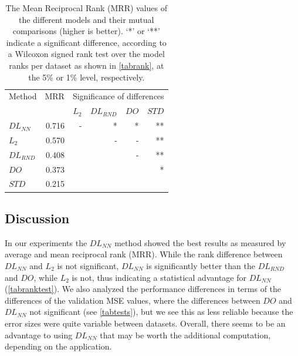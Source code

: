 \documentclass[conference]{IEEEtran}
\begin{document}
\begin{table}[tb]
 \begin{center}
 \begin{small}
 \begin{sc}
 
 \begin{tabular}{lr|rrrr}
 \toprule
 Method & MRR & \multicolumn{4}{c}{Significance of differences} \\ 
 & & \multicolumn{1}{c}{$L_2$} & \multicolumn{1}{c}{$DL_{RND}$} & \multicolumn{1}{c}{$DO$} & \multicolumn{1}{c}{$STD$} \\ 
 \midrule
 $DL_{NN}$ & 0.716 & - & * & * & ** \\
 $L_2$ & 0.570 & & - & - & ** \\
 $DL_{RND}$ & 0.408 & & & - & ** \\
 $DO$ & 0.373 & & & & * \\
 $STD$ & 0.215 & & & & \\ 
 \bottomrule 
 
 \end{tabular}
 \end{sc}
 \end{small}
 \end{center} 
 \caption{The Mean Reciprocal Rank (MRR) values of the different models and their mutual comparisons (higher is better). 
 `*' or `**' indicate a significant difference, according to a Wilcoxon signed rank test over the model ranks per dataset as shown in \autoref{tabrank}, at the 5\% or 1\% level, respectively.}
 \label{tabranktest}
 
\end{table}



\subsection{Discussion}\label{sec:discussion}

In our experiments the $DL_{NN}$ method showed the best results as measured by average and mean reciprocal rank (MRR). 
While the rank difference between $DL_{NN}$ and $L_2$ is not significant, $DL_{NN}$ is significantly better than the $DL_{RND}$ and $DO$, while $L_2$ is not, thus indicating a statistical advantage for $DL_{NN}$ (\autoref{tabranktest}). 
We also analyzed the performance differences in terms of the differences of the validation MSE values, where the differences between $DO$ and $DL_{NN}$ not significant (see \autoref{tabtests}), but we see this as less reliable because the error sizes were quite variable between datasets. 
Overall, there seems to be an advantage to using $DL_{NN}$ that may be worth the additional computation, depending on the application.
\end{document}
